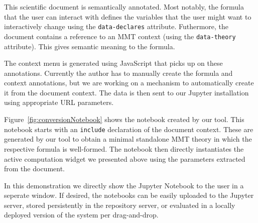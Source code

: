 This scientific document is semantically annotated. 
Most notably, the formula that the user can interact with defines the variables that the user might want to interactively change using the \texttt{data-declares} attribute. 
Futhermore, the document contains a reference to an MMT context (using the \texttt{data-theory} attribute). 
This gives semantic meaning to the formula. 

The context menu is generated using JavaScript that picks up on these annotations.
Currently the author has to manually create the formula and context annotations, but we are working on a mechanism to automatically create it from the document context.
The data is then sent to our Jupyter installation using appropriate URL parameters. 

Figure~\ref{fig:conversionNotebook} shows the notebook created by our tool.
This notebook starts with an \texttt{include} declaration of the document context. 
These are generated by our tool to obtain a minimal standalone MMT theory in which the respective formula is well-formed. 
The notebook then directly instantiates the active computation widget we presented above using the parameters extracted from the document. 

In this demonstration we directly show the Jupyter Notebook to the user in a seperate window. 
If desired, the notebooks can be easily uploaded to the Jupyter server, stored persistently in the repository server, or evaluated in a locally deployed version of the system per drag-and-drop.


